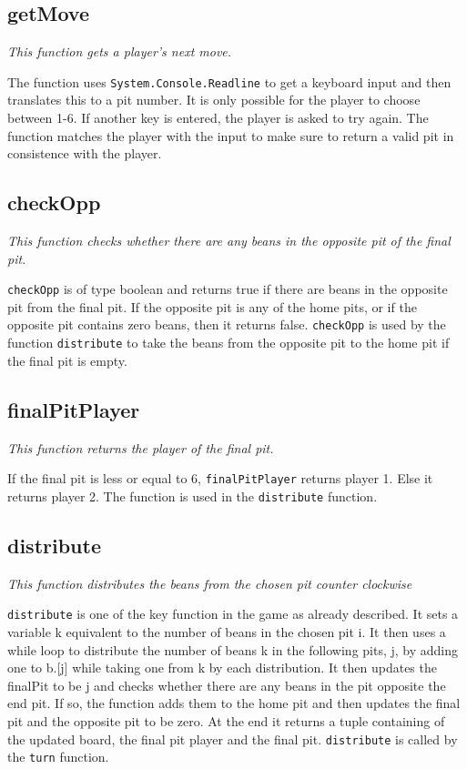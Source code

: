 \documentclass[a4paper]{report}
\begin{document}
\subsection*{getMove}
{\it This function gets a player's next move.}

The function uses \texttt{System.Console.Readline} to get a keyboard input and then translates this to a pit number. It is only possible for the player to choose between 1-6. If another key is entered, the player is asked to try again. The function matches the player with the input to make sure to return a valid pit in consistence with the player.

\subsection*{checkOpp}
{\it This function checks whether there are any beans in the opposite pit of the final pit.}

\texttt{checkOpp} is of type boolean and returns true if there are beans in the opposite pit from the final pit. If the opposite pit is any of the home pits, or if the opposite pit contains zero beans, then it returns false. \texttt{checkOpp} is used by the function \texttt{distribute} to take the beans from the opposite pit to the home pit if the final pit is empty.

\subsection*{finalPitPlayer}
{\it This function returns the player of the final pit.}

If the final pit is less or equal to 6, \texttt{finalPitPlayer} returns player 1. Else it returns player 2. The function is used in the \texttt{distribute} function.

\subsection*{distribute}
{\it This function distributes the beans from the chosen pit counter clockwise}

\texttt{distribute} is one of the key function in the game as already described. It sets a variable k equivalent to the number of beans in the chosen pit i. It then uses a while loop to distribute the number of beans k in the following pits, j, by adding one to b.[j] while taking one from k by each distribution. It then updates the finalPit to be j and checks whether there are any beans in the pit opposite the end pit. If so, the function adds them to the home pit and then updates the final pit and the opposite pit to be zero. At the end it returns a tuple containing of the updated board, the final pit player and the final pit. \texttt{distribute} is called by the \texttt{turn} function.
\end{document}
